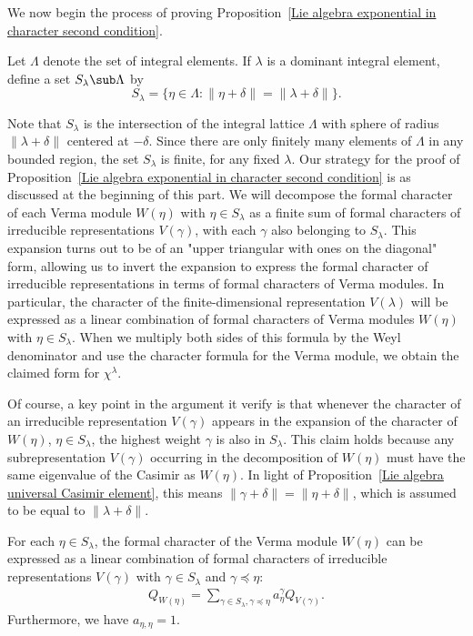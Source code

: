 We now begin the process of proving Proposition~\ref{Lie algebra exponential in character second condition}.
\begin{definition}
Let $\Lambda$ denote the set of integral elements. If $\lambda$ is a dominant integral element, define a set $S_\lambda\sub\Lambda$ by
\[S_\lambda=\{\eta\in\Lambda:\|\eta+\delta\|=\|\lambda+\delta\|\}.\]
\end{definition}
Note that $S_\lambda$ is the intersection of the integral lattice $\Lambda$ with sphere of radius $\|\lambda+\delta\|$ centered at $-\delta$. Since there are only finitely many elements of $\Lambda$ in any bounded region, the set $S_\lambda$ is finite, for any fixed $\lambda$. Our strategy for the proof of Proposition~\ref{Lie algebra exponential in character second condition} is as discussed at the beginning of this part. We will decompose the formal character of each Verma module $W(\eta)$ with $\eta\in S_\lambda$ as a finite sum of formal characters of irreducible representations $V(\gamma)$, with each $\gamma$ also belonging to $S_\lambda$. This expansion turns out to be of an "upper triangular with ones on the diagonal" form, allowing us to invert the expansion to express the formal character of irreducible representations in terms of formal characters of Verma modules. In particular, the character of the finite-dimensional representation $V(\lambda)$ will be expressed as a linear combination of formal characters of Verma modules $W(\eta)$ with $\eta\in S_\lambda$. When we multiply both sides of this formula by the Weyl denominator and use the character formula for the Verma module, we obtain the claimed form for $\chi^\lambda$.\par
Of course, a key point in the argument it verify is that whenever the character of an irreducible representation $V(\gamma)$ appears in the expansion of the character of $W(\eta)$, $\eta\in S_\lambda$, the highest weight $\gamma$ is also in $S_\lambda$. This claim holds because any subrepresentation $V(\gamma)$ occurring in the decomposition of $W(\eta)$ must have the same eigenvalue of the Casimir as $W(\eta)$. In light of Proposition~\ref{Lie algebra universal Casimir element}, this means $\|\gamma+\delta\|=\|\eta+\delta\|$, which is assumed to be equal to $\|\lambda+\delta\|$.
\begin{proposition}\label{Lie algebra character of Verma into irreducible}
For each $\eta\in S_\lambda$, the formal character of the Verma module $W(\eta)$ can be expressed as a linear combination of formal characters of irreducible representations $V(\gamma)$ with $\gamma\in S_\lambda$ and $\gamma\preceq\eta$:
\begin{align}\label{Lie algebra character of Verma into irreducible-1}
Q_{W(\eta)}=\sum_{\gamma\in S_\lambda,\gamma\preceq\eta}a_{\eta}^{\gamma}Q_{V(\gamma)}.
\end{align}
Furthermore, we have $a_{\eta,\eta}=1$.
\end{proposition}

